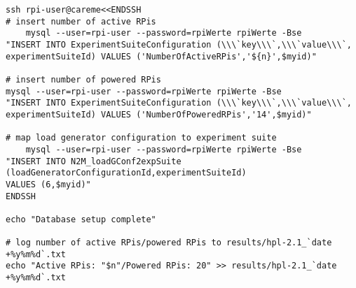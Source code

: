 \begin{verbatim}
ssh rpi-user@careme<<ENDSSH                                                                                                                                                 
# insert number of active RPis                                                                                                                                              
	mysql --user=rpi-user --password=rpiWerte rpiWerte -Bse 
"INSERT INTO ExperimentSuiteConfiguration (\\\`key\\\`,\\\`value\\\`,
experimentSuiteId) VALUES ('NumberOfActiveRPis','${n}',$myid)"                                                                                                                                                            
                                                                                                                                                                            
# insert number of powered RPis                                                                                                                                             
mysql --user=rpi-user --password=rpiWerte rpiWerte -Bse 
"INSERT INTO ExperimentSuiteConfiguration (\\\`key\\\`,\\\`value\\\`,
experimentSuiteId) VALUES ('NumberOfPoweredRPis','14',$myid)"                                                                                                                                                             
                                                                                                                                                                            
# map load generator configuration to experiment suite                                                                                                                      
	mysql --user=rpi-user --password=rpiWerte rpiWerte -Bse 
"INSERT INTO N2M_loadGConf2expSuite (loadGeneratorConfigurationId,experimentSuiteId) 
VALUES (6,$myid)"              
ENDSSH

echo "Database setup complete"

# log number of active RPis/powered RPis to results/hpl-2.1_`date +%y%m%d`.txt
echo "Active RPis: "$n"/Powered RPis: 20" >> results/hpl-2.1_`date +%y%m%d`.txt


\end{verbatim}
